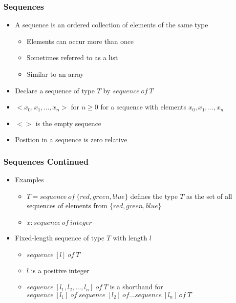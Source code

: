 \documentclass[t,12pt,numbers,fleqn]{beamer}
\begin{document}

\begin{frame}
\frametitle{Sequences}
\begin{itemize}
\item A sequence is an ordered collection of elements of the same type
\begin{itemize}
\item Elements can occur more than once
\item Sometimes referred to as a list
\item Similar to an array
\end{itemize}
\item Declare a sequence of type $T$ by $sequence~of~T$
\item $< x_0, x_1, ..., x_n >$ for $n \geq 0$ for a sequence with elements $x_0, x_1, ..., x_n$
\item $< >$ is the empty sequence
\item Position in a sequence is zero relative
\end{itemize}
\end{frame}


\begin{frame}
\frametitle{Sequences Continued}
\begin{itemize}
\item Examples
\begin{itemize}
\item $T = sequence~of~\{ red, green, blue \}$ defines the type $T$ as the set of all sequences of elements from
$\{red, green, blue \}$
\item $x: sequence~of~integer$
\end{itemize}
\item Fixed-length sequence of type $T$ with length $l$
\begin{itemize}
\item $sequence~[l]~of~T$
\item $l$ is a positive integer
\item $sequence~[l_1, l_2, ..., l_n ]~of~T$ is a shorthand for $sequence~[l_1]~of~sequence~[l_2]~of ... sequence~
[l_n]~ of~T$
\end{itemize}
\end{itemize}
\end{frame}

\end{document}
